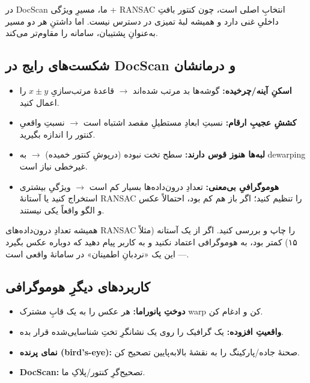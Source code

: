 \documentclass[12pt,a4paper]{article}
\begin{document}
\begin{nokte}
در DocScanِ ما، مسیرِ ویژگی + RANSAC انتخابِ اصلی است، چون کنتور بافتِ داخلیِ غنی دارد و همیشه لبهٔ تمیزی در دسترس نیست. اما داشتنِ هر دو مسیر به‌عنوانِ پشتیبان، سامانه را مقاوم‌تر می‌کند.
\end{nokte}

\subsection{شکست‌های رایج در DocScan و درمانشان}

\begin{itemize}
  \item \textbf{اسکنِ آینه/چرخیده:} گوشه‌ها بد مرتب شده‌اند $\rightarrow$ قاعدهٔ مرتب‌سازیِ $x{\pm}y$ را اعمال کنید.
  \item \textbf{کششِ عجیبِ ارقام:} نسبتِ ابعادِ مستطیلِ مقصد اشتباه است $\rightarrow$ نسبتِ واقعیِ کنتور را اندازه بگیرید.
  \item \textbf{لبه‌ها هنوز قوس دارند:} سطح تخت نبوده (درپوشِ کنتور خمیده) $\rightarrow$ به dewarpingِ غیرخطی نیاز است.
  \item \textbf{هوموگرافیِ بی‌معنی:} تعدادِ درون‌داده‌ها بسیار کم است $\rightarrow$ ویژگیِ بیشتری استخراج کنید یا آستانهٔ RANSAC را تنظیم کنید؛ اگر باز هم کم بود، احتمالاً عکس و الگو واقعاً یکی نیستند.
\end{itemize}

\begin{hoshdar}
همیشه تعدادِ درون‌داده‌های RANSAC را چاپ و بررسی کنید. اگر از یک آستانه (مثلاً ۱۵) کمتر بود، به هوموگرافی اعتماد نکنید و به کاربر پیام دهید که دوباره عکس بگیرد — این یک «نردبانِ اطمینان» در سامانهٔ واقعی است.
\end{hoshdar}

\subsection{کاربردهای دیگرِ هوموگرافی}

\begin{itemize}
  \item \textbf{دوختِ پانوراما:} هر عکس را به یک قابِ مشترک warp کن و ادغام کن.
  \item \textbf{واقعیتِ افزوده:} یک گرافیک را روی یک نشانگرِ تختِ شناسایی‌شده قرار بده.
  \item \textbf{نمای پرنده (bird's-eye):} صحنهٔ جاده/پارکینگ را به نقشهٔ بالا‌به‌پایین تصحیح کن.
  \item \textbf{DocScan:} تصحیح‌گرِ کنتور/پلاکِ ما.
\end{itemize}
\end{document}
